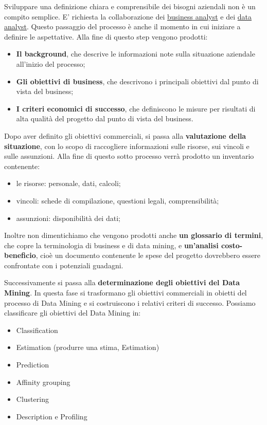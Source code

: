\documentclass[a4paper]{extarticle}
\begin{document}
Sviluppare una definizione chiara e comprensibile dei bisogni aziendali non è un compito semplice. E' richiesta la collaborazione dei \underline{business analyst} e dei \underline{data analyst}. Questo passaggio del processo è anche il momento in cui iniziare a definire le aspettative. Alla fine di questo step vengono prodotti:

\begin{itemize}
	\item \textbf{Il background}, che descrive le informazioni note sulla situazione aziendale all'inizio del processo;
	\item \textbf{Gli obiettivi di business}, che descrivono i principali obiettivi dal punto di vista del business;
	\item \textbf{I criteri economici di successo}, che definiscono le misure per risultati di alta qualità del progetto dal punto di vista del business.
\end{itemize}

Dopo aver definito gli obiettivi commerciali, si passa alla \textbf{valutazione della situazione}, con lo scopo di raccogliere informazioni sulle risorse, sui vincoli e sulle assunzioni. Alla fine di questo sotto processo verrà prodotto un inventario contenente:

\begin{itemize}
\item le risorse: personale, dati, calcoli;
\item vincoli: schede di compilazione, questioni legali, comprensibilità;
\item assunzioni: disponibilità dei dati;
\end{itemize}

Inoltre non dimentichiamo che vengono prodotti anche \textbf{un glossario di termini}, che copre la terminologia di business e di data mining, e \textbf{un'analisi costo-beneficio}, cioè un documento contenente le spese del progetto dovrebbero essere confrontate con i potenziali guadagni.

Successivamente si passa alla \textbf{determinazione degli obiettivi del Data Mining}. In questa fase si trasformano gli obiettivi commerciali in obietti del processo di Data Mining e si costruiscono i relativi criteri di successo. Possiamo classificare gli obiettivi del Data Mining in:

\begin{itemize}
\item Classification
\item Estimation (produrre una stima, Estimation)
\item Prediction
\item Affinity grouping
\item Clustering
\item Description e Profiling
\end{itemize}
\end{document}
